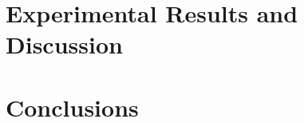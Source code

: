 \documentclass[lettersize,journal]{IEEEtran}
\begin{document}
\section{Experimental Results and Discussion}
\label{sec:results}


\section{Conclusions}
\label{sec:conclusions}


\vspace{11pt}


\vfill



\end{document}
